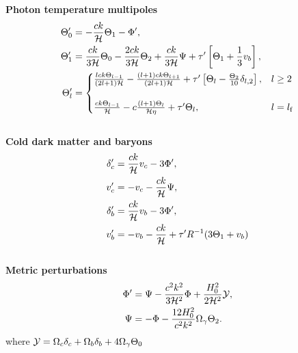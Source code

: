     \begin{tcolorbox}[
        width=1.025\linewidth,
        colback=blue!5!white,
        colframe=white
    ]
    
    \textbf{Photon temperature multipoles}
    \begin{subequations}\label{eq:m3:theory:photon_temp_multipoles}
        \begin{align}
            \Theta_0' &= -\frac{ck}{\mathcal{H}}\Theta_1-\Phi',\label{eq:m3:theory:photon_monopole}\\
            \Theta_1' &= \frac{ck}{3\mathcal{H}}\Theta_0 - \frac{2ck}{3\mathcal{H}}\Theta_2 +\frac{ck}{3\mathcal{H}}\Psi+\tau'\left[\Theta_1+\frac{1}{3}v_b\right],\label{eq:m3:theory:photon_dipole}\\
            \Theta_l' &= \begin{cases}
                \frac{lck\Theta_{l-1}}{(2l+1)\mathcal{H}} -\frac{(l+1)ck\Theta_{l+1}}{(2l+1)\mathcal{H}} +\tau'\left[\Theta_l-\frac{\Theta_2}{10}\delta_{l,2}\right], &l\geq2\\
                \\
                \frac{ck\Theta_{l-1}}{\mathcal{H}} - c\frac{(l+1)\Theta_l}{\mathcal{H}\eta}+\tau'\Theta_l, &l=l_\mathrm{f}
            \end{cases}\label{eq:m3:theory:photon_multipole}
        \end{align}
    \end{subequations}
    \\
    \textbf{Cold dark matter and baryons}
    \begin{subequations}\label{eq:m3:theory:cdm_baryon_diffeqs}
        \begin{align}
            \delta'_c &= \frac{ck}{\mathcal{H}}v_c-3\Phi', \label{eq:m3:theory:delta_cdm}\\
            v'_c &= -v_c-\frac{ck}{\mathcal{H}}\Psi, \label{eq:m3:theory:v_cdm}\\
            \delta'_b &= \frac{ck}{\mathcal{H}}v_b - 3\Phi', \label{eq:m3:theory:delta_b}\\
            v'_b &= -v_b - \frac{ck}{\mathcal{H}} + \tau'R^{-1}(3\Theta_1+v_b) \label{eq:m3:theory:v_b}
        \end{align}
    \end{subequations}
    \\
    \textbf{Metric perturbations}
    \begin{subequations}\label{eq:m3:theory:metric_perturbations_final}
        \begin{align}
            \Phi' &= \Psi - \frac{c^2k^2}{3\mathcal{H}^2}\Phi + \frac{H_0^2}{2\mathcal{H}^2}\mathcal{Y}, \label{eq:m3:theory:phi_perturbation}\\
            \Psi &= -\Phi - \frac{12H_0^2}{c^2k^2}\Omega_\gamma\Theta_2. \label{eq:m3:theory:psi_perturbation}
        \end{align}
    \end{subequations}
    where $\mathcal{Y} = \Omega_c\delta_c+\Omega_b\delta_b+4\Omega_\gamma\Theta_0$

\end{tcolorbox}
